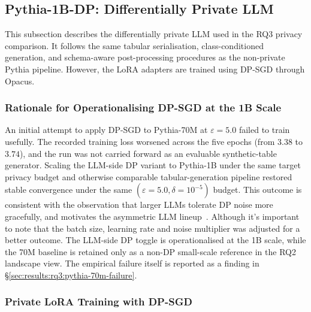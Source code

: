 \subsection{Pythia-1B-DP: Differentially Private LLM}
\label{sec:methods:pythia-dp}


This subsection describes the differentially private LLM used in the RQ3
privacy comparison. It follows the same tabular serialisation,
class-conditioned generation, and schema-aware post-processing procedures
as the non-private Pythia pipeline. However, the LoRA adapters are trained
using DP-SGD through Opacus.

\subsubsection{Rationale for Operationalising DP-SGD at the 1B Scale}
\label{sec:methods:pythia-dp:why-1b}

An initial attempt to apply DP-SGD to Pythia-70M at $\varepsilon = 5.0$
failed to train usefully. The recorded training loss worsened across the
five epochs (from $3.38$ to $3.74$), and the run was not carried forward
as an evaluable synthetic-table generator.
Scaling the LLM-side DP variant to Pythia-1B under the same
target privacy budget and otherwise comparable tabular-generation pipeline
restored stable convergence under the same
$(\varepsilon = 5.0, \delta = 10^{-5})$ budget. This outcome is consistent
with the observation that larger
LLMs tolerate DP noise more gracefully, and motivates the asymmetric LLM
lineup~\cite{Li2022LargeDP}. Although it's important to note that the batch size, learning rate 
and noise multiplier was adjusted for a better outcome. The LLM-side DP toggle is operationalised at the 1B scale, while
the 70M baseline is retained only as a non-DP small-scale reference in
the RQ2 landscape view. The empirical failure itself is reported as a
finding in \S\ref{sec:results:rq3:pythia-70m-failure}.

\subsubsection{Private LoRA Training with DP-SGD}
\label{sec:methods:pythia-dp:training}

